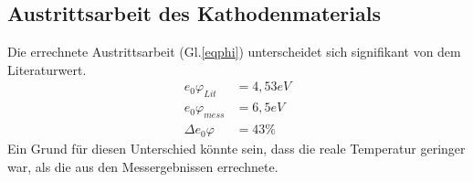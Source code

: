 \subsection{Austrittsarbeit des Kathodenmaterials}
Die errechnete Austrittsarbeit (Gl.\ref{eqphi}) unterscheidet sich signifikant von dem Literaturwert\cite{tafel}.
\begin{align}
	e_0\varphi_{Lit}&=4{,}53eV \\
	e_0\varphi_{mess}&=6{,}5eV\\
	\Delta e_0\varphi&=43\%
 \end{align}
 Ein Grund für diesen Unterschied könnte sein, dass die reale Temperatur geringer war, als die aus den Messergebnissen errechnete.
 
